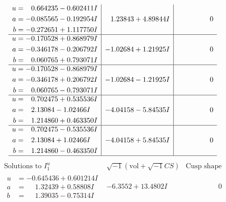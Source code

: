 \documentclass[1p]{elsarticle_modified}
\theoremstyle{definition}
\newcommand{\I}{\sqrt{-1}}
\begin{document}
$$\begin{array}{c|c|c}
\begin{aligned}
u &= \phantom{-}0.664235 - 0.602411 I \\
a &= -0.085565 - 0.192954 I \\
b &= -0.272651 + 1.117750 I\end{aligned}
 & \phantom{-}1.23843 + 4.89844 I & \phantom{-0.000000 } 0 \\ \hline\begin{aligned}
u &= -0.170528 + 0.868979 I \\
a &= -0.346178 - 0.206792 I \\
b &= \phantom{-}0.060765 + 0.793071 I\end{aligned}
 & -1.02684 + 1.21925 I & \phantom{-0.000000 } 0 \\ \hline\begin{aligned}
u &= -0.170528 - 0.868979 I \\
a &= -0.346178 + 0.206792 I \\
b &= \phantom{-}0.060765 - 0.793071 I\end{aligned}
 & -1.02684 - 1.21925 I & \phantom{-0.000000 } 0 \\ \hline\begin{aligned}
u &= \phantom{-}0.702475 + 0.535536 I \\
a &= \phantom{-}2.13084 - 1.02466 I \\
b &= \phantom{-}1.214860 + 0.463350 I\end{aligned}
 & -4.04158 - 5.84535 I & \phantom{-0.000000 } 0 \\ \hline\begin{aligned}
u &= \phantom{-}0.702475 - 0.535536 I \\
a &= \phantom{-}2.13084 + 1.02466 I \\
b &= \phantom{-}1.214860 - 0.463350 I\end{aligned}
 & -4.04158 + 5.84535 I & \phantom{-0.000000 } 0\\
 \hline 
 \end{array}$$\newpage$$\begin{array}{c|c|c}  
\text{Solutions to }I^u_{1}& \I (\text{vol} + \sqrt{-1}CS) & \text{Cusp shape}\\
 \hline 
\begin{aligned}
u &= -0.645436 + 0.601214 I \\
a &= \phantom{-}1.32439 + 0.58808 I \\
b &= \phantom{-}1.39035 - 0.75314 I\end{aligned}
 & -6.3552 + 13.4802 I & \phantom{-0.000000 } 0 \\ \hline\begin{aligned}

\end{aligned}
\end{array}$$
\end{document}
